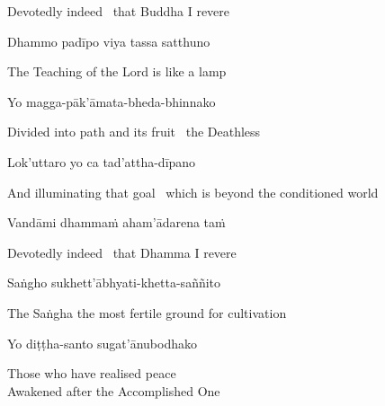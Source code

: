 \begin{english}
  Devotedly indeed \breathmark\ that Buddha I revere
\end{english}

Dhammo padīpo viya tassa satthuno

\begin{english}
  The Teaching of the Lord is like a lamp\ifdigitalversion\makeatletter\hyperlink{endnote8-appendix}\makeatother\fi
\end{english}

Yo magga-pāk'āmata-bheda-bhinnako

\begin{english}
  Divided into path and its fruit \breathmark\ the Deathless\ifdigitalversion\makeatletter\hyperlink{endnote9-appendix}\makeatother\fi
\end{english}

Lok'uttaro yo ca tad'attha-dīpano

\begin{english}
  And illuminating that goal \breathmark\ which is beyond the conditioned world\ifdigitalversion\makeatletter\hyperlink{endnote10-appendix}\makeatother\fi
\end{english}

\ifbsixversion\clearpage\fi

Vandāmi dhammaṁ aham'ādarena taṁ

\begin{english}
  Devotedly indeed \breathmark\ that Dhamma I revere
\end{english}

Saṅgho sukhett'ābhyati-khetta-saññito

\begin{english}
  The Saṅgha the most fertile ground for cultivation
\end{english}

Yo diṭṭha-santo sugat'ānubodhako

\begin{english}
  Those who have realised peace\\
  Awakened after the Accomplished One
\end{english}

